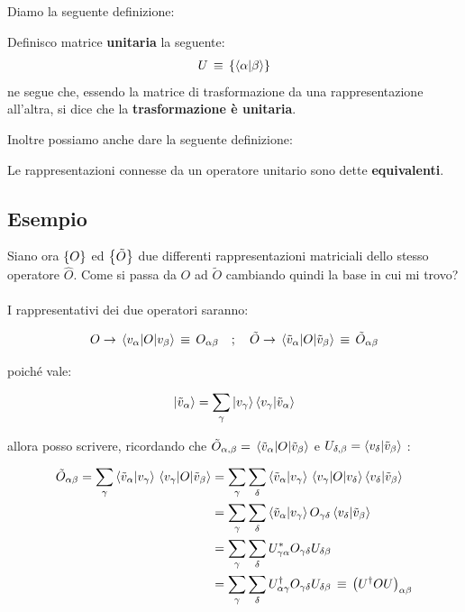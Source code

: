 	Diamo la seguente definizione:
	
\begin{mydef}
	Definisco matrice \textbf{unitaria} la seguente:
\begin{align*}
	U \, \equiv \, \{ \braket{\alpha}{\beta} \}
\end{align*}
	ne segue che, essendo la matrice di trasformazione da una rappresentazione all'altra, si dice che la \textbf{trasformazione è unitaria}.
\end{mydef}

	Inoltre possiamo anche dare la seguente definizione:
	
\begin{mydef}
	Le rappresentazioni connesse da un operatore unitario sono dette \textbf{equivalenti}.
\end{mydef}

\subsection{Esempio}

	Siano ora $\qty{O}$ ed $\qty{\tilde{O}}$ due differenti rappresentazioni matriciali dello stesso operatore $\hat{O}$. Come si passa da $O$ ad $\tilde{O}$ cambiando quindi la base in cui mi trovo?
	\\
	\\
	I rappresentativi dei due operatori saranno:
	
\begin{align*}
	O \to \mel{v_{\alpha}}{O}{v_{\beta}} \, \equiv \, O_{\alpha \beta} \quad ; \quad \tilde{O} \to \mel{\tilde{v}_{\alpha}}{O}{\tilde{v}_{\beta}} \, \equiv \, \tilde{O}_{\alpha \beta} 
\end{align*}

	poiché vale:
	
\begin{align*}
	\ket{\tilde{v}_{\alpha}} = \sum_{\gamma} \ket{v_{\gamma}} \braket{v_{\gamma}}{\tilde{v}_{\alpha}}
\end{align*}

	allora posso scrivere, ricordando che $\tilde{O}_{\alpha, \beta} = \mel{\tilde{v}_{\alpha}}{O}{\tilde{v}_{\beta}}$ e $U_{\delta, \beta} = \braket{v_{\delta}}{\tilde{v}_{\beta}}$ :
	
\begin{align*}
	\tilde{O}_{\alpha \beta} = \sum_{\gamma} \braket{\tilde{v}_{\alpha}}{v_{\gamma}} \mel{v_{\gamma}}{O}{\tilde{v}_{\beta}} &=  \sum_{\gamma} \sum_{\delta} \braket{\tilde{v}_{\alpha}}{v_{\gamma}} \mel{v_{\gamma}}{O}{v_{\delta}}     \braket{v_{\delta}}{\tilde{v}_{\beta}}  \\
	&= \sum_{\gamma} \sum_{\delta}  \braket{\tilde{v}_{\alpha}}{v_{\gamma}}  O_{\gamma \delta}   \braket{v_{\delta}}{\tilde{v}_{\beta}} \\
	&= \sum_{\gamma} \sum_{\delta}  U^*_{\gamma \alpha} O_{\gamma \delta} U_{\delta \beta} \\
	&= \sum_{\gamma} \sum_{\delta} U^{\dagger}_{\alpha \gamma} O_{\gamma \delta} U_{\delta \beta} \, \equiv \, \qty(U^{\dagger} O U)_{\alpha \beta}
\end{align*}
	
